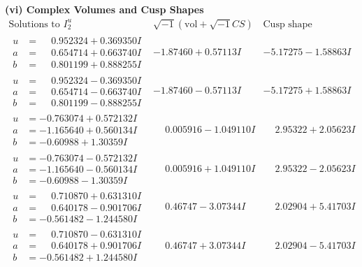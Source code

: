 \documentclass[1p]{elsarticle_modified}
\theoremstyle{definition}
\newcommand{\I}{\sqrt{-1}}
\begin{document}
\newpage\flushleft \textbf{(vi) Complex Volumes and Cusp Shapes}
$$\begin{array}{c|c|c}  
\text{Solutions to }I^u_{2}& \I (\text{vol} + \sqrt{-1}CS) & \text{Cusp shape}\\
 \hline 
\begin{aligned}
u &= \phantom{-}0.952324 + 0.369350 I \\
a &= \phantom{-}0.654714 + 0.663740 I \\
b &= \phantom{-}0.801199 + 0.888255 I\end{aligned}
 & -1.87460 + 0.57113 I & -5.17275 - 1.58863 I \\ \hline\begin{aligned}
u &= \phantom{-}0.952324 - 0.369350 I \\
a &= \phantom{-}0.654714 - 0.663740 I \\
b &= \phantom{-}0.801199 - 0.888255 I\end{aligned}
 & -1.87460 - 0.57113 I & -5.17275 + 1.58863 I \\ \hline\begin{aligned}
u &= -0.763074 + 0.572132 I \\
a &= -1.165640 + 0.560134 I \\
b &= -0.60988 + 1.30359 I\end{aligned}
 & \phantom{-}0.005916 - 1.049110 I & \phantom{-}2.95322 + 2.05623 I \\ \hline\begin{aligned}
u &= -0.763074 - 0.572132 I \\
a &= -1.165640 - 0.560134 I \\
b &= -0.60988 - 1.30359 I\end{aligned}
 & \phantom{-}0.005916 + 1.049110 I & \phantom{-}2.95322 - 2.05623 I \\ \hline\begin{aligned}
u &= \phantom{-}0.710870 + 0.631310 I \\
a &= \phantom{-}0.640178 - 0.901706 I \\
b &= -0.561482 - 1.244580 I\end{aligned}
 & \phantom{-}0.46747 - 3.07344 I & \phantom{-}2.02904 + 5.41703 I \\ \hline\begin{aligned}
u &= \phantom{-}0.710870 - 0.631310 I \\
a &= \phantom{-}0.640178 + 0.901706 I \\
b &= -0.561482 + 1.244580 I\end{aligned}
 & \phantom{-}0.46747 + 3.07344 I & \phantom{-}2.02904 - 5.41703 I \\ \hline\begin{aligned}

\end{aligned}
\end{array}$$
\end{document}
